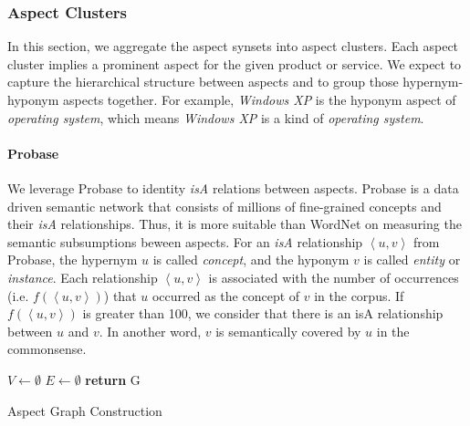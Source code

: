 \subsubsection{Aspect Clusters}
\label{sec:clusters}
In this section, we aggregate the aspect synsets
into aspect clusters.
Each aspect cluster implies a prominent aspect
for the given product or service.
We expect to 
capture the hierarchical structure between aspects
and to group those hypernym-hyponym aspects together.
For example, 
 \textit{Windows XP} is the hyponym aspect of
\textit{operating system}, which means \textit{Windows XP} is
a kind of \textit{operating system}.

\paragraph{Probase}
We leverage Probase to identity \textit{isA} relations
between aspects.
Probase is a data driven semantic network that
consists of millions of fine-grained concepts
and their \textit{isA} relationships.
Thus, it is more suitable than WordNet on measuring
the semantic subsumptions beween aspects.
For an \textit{isA} relationship $\left\langle u,v\right\rangle$ from Probase, 
the hypernym $u$ is called \textit{concept},
and the hyponym $v$ is called \textit{entity} or \textit{instance}.
Each relationship $\left\langle u,v\right\rangle$
is associated with the number of occurrences (i.e. $f(\left\langle u,v\right\rangle)$)
that $u$ occurred as the concept of $v$ in the corpus.
If $f(\left\langle u,v\right\rangle)$ is greater than 100,
we consider that there is an isA relationship between $u$
and $v$. In another word, $v$ is semantically covered 
by $u$ in the commonsense.

\begin{algorithm}[!th]
	\small
	\BlankLine
	$V \leftarrow \emptyset$\;
	$E \leftarrow \emptyset$\;
	{\bf return} G \;
	\caption{Aspect Graph Construction\label{alg:relations}}
\end{algorithm}

